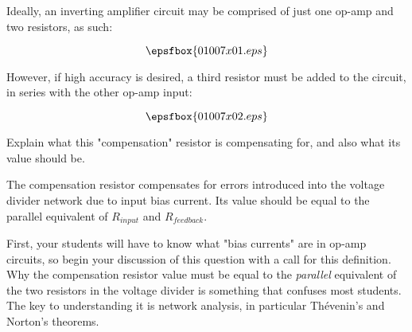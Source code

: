 

Ideally, an inverting amplifier circuit may be comprised of just one op-amp and two resistors, as such:

$$\epsfbox{01007x01.eps}$$

However, if high accuracy is desired, a third resistor must be added to the circuit, in series with the other op-amp input:

$$\epsfbox{01007x02.eps}$$

Explain what this "compensation" resistor is compensating for, and also what its value should be.







The compensation resistor compensates for errors introduced into the voltage divider network due to input bias current.  Its value should be equal to the parallel equivalent of $R_{input}$ and $R_{feedback}$.







First, your students will have to know what "bias currents" are in op-amp circuits, so begin your discussion of this question with a call for this definition.  Why the compensation resistor value must be equal to the {\it parallel} equivalent of the two resistors in the voltage divider is something that confuses most students.  The key to understanding it is network analysis, in particular Th\'evenin's and Norton's theorems.




